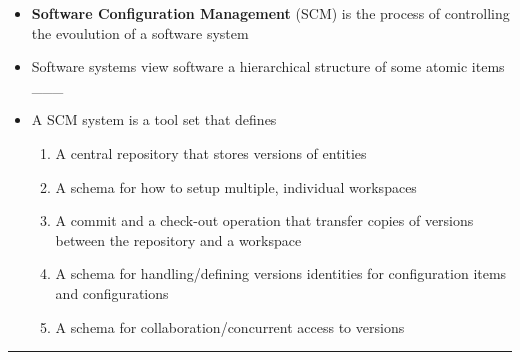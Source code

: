 \documentclass[11pt]{article}
\providecommand{\tightlist}{%
      \setlength{\itemsep}{0pt}\setlength{\parskip}{0pt}}
\begin{document}
\begin{itemize}
\tightlist
\item
  \textbf{Software Configuration Management} (SCM) is the process of
  controlling the evoulution of a software system
\item
  Software systems view software a hierarchical structure of some atomic
  items \_\_\_
\item
  A SCM system is a tool set that defines

  \begin{enumerate}
  \def\labelenumi{\arabic{enumi}.}
  \tightlist
  \item
    A central repository that stores versions of entities
  \item
    A schema for how to setup multiple, individual workspaces
  \item
    A commit and a check-out operation that transfer copies of versions
    between the repository and a workspace
  \item
    A schema for handling/defining versions identities for configuration
    items and configurations
  \item
    A schema for collaboration/concurrent access to versions
  \end{enumerate}
\end{itemize}

\begin{center}\rule{0.5\linewidth}{\linethickness}\end{center}
\end{document}
